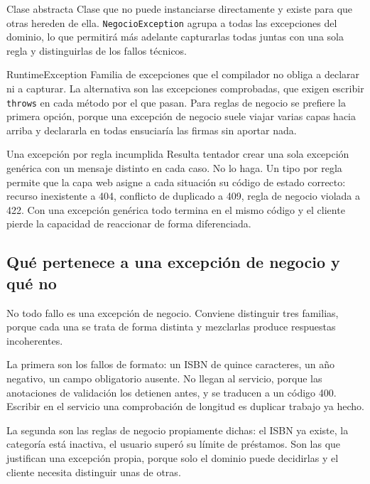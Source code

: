 \documentclass[11pt,a4paper,openany]{book}
\begin{document}
\begin{cajadefinicion}{Clase abstracta}
	Clase que no puede instanciarse directamente y existe para que otras hereden de ella. \texttt{NegocioException} agrupa a todas las excepciones del dominio, lo que permitirá más adelante capturarlas todas juntas con una sola regla y distinguirlas de los fallos técnicos.
\end{cajadefinicion}

\begin{cajadefinicion}{RuntimeException}
	Familia de excepciones que el compilador no obliga a declarar ni a capturar. La alternativa son las excepciones comprobadas, que exigen escribir \texttt{throws} en cada método por el que pasan. Para reglas de negocio se prefiere la primera opción, porque una excepción de negocio suele viajar varias capas hacia arriba y declararla en todas ensuciaría las firmas sin aportar nada.
\end{cajadefinicion}

\begin{cajabuenas}{Una excepción por regla incumplida}
	Resulta tentador crear una sola excepción genérica con un mensaje distinto en cada caso. No lo haga. Un tipo por regla permite que la capa web asigne a cada situación su código de estado correcto: recurso inexistente a 404, conflicto de duplicado a 409, regla de negocio violada a 422. Con una excepción genérica todo termina en el mismo código y el cliente pierde la capacidad de reaccionar de forma diferenciada.
\end{cajabuenas}

\subsection{Qué pertenece a una excepción de negocio y qué no}
\label{sec:que-excepcion}

No todo fallo es una excepción de negocio. Conviene distinguir tres familias, porque cada una se trata de forma distinta y mezclarlas produce respuestas incoherentes.

La primera son los fallos de formato: un ISBN de quince caracteres, un año negativo, un campo obligatorio ausente. No llegan al servicio, porque las anotaciones de validación los detienen antes, y se traducen a un código 400. Escribir en el servicio una comprobación de longitud es duplicar trabajo ya hecho.

La segunda son las reglas de negocio propiamente dichas: el ISBN ya existe, la categoría está inactiva, el usuario superó su límite de préstamos. Son las que justifican una excepción propia, porque solo el dominio puede decidirlas y el cliente necesita distinguir unas de otras.
\end{document}

